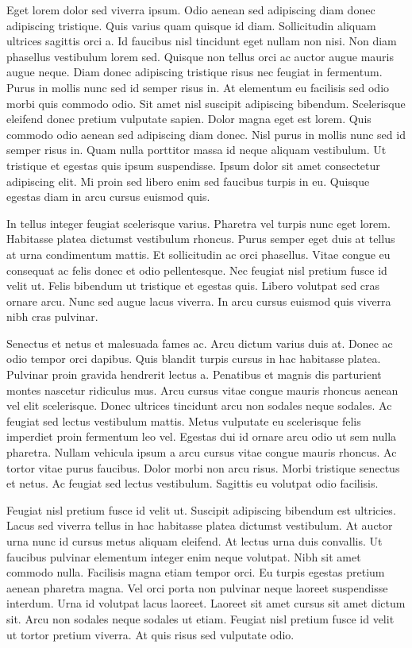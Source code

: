 \documentclass[11pt,a4paper]{article}
\begin{document}
Eget lorem dolor sed viverra ipsum. Odio aenean sed adipiscing diam donec adipiscing tristique. Quis varius quam quisque id diam. Sollicitudin aliquam ultrices sagittis orci a. Id faucibus nisl tincidunt eget nullam non nisi. Non diam phasellus vestibulum lorem sed. Quisque non tellus orci ac auctor augue mauris augue neque. Diam donec adipiscing tristique risus nec feugiat in fermentum. Purus in mollis nunc sed id semper risus in. At elementum eu facilisis sed odio morbi quis commodo odio. Sit amet nisl suscipit adipiscing bibendum. Scelerisque eleifend donec pretium vulputate sapien. Dolor magna eget est lorem. Quis commodo odio aenean sed adipiscing diam donec. Nisl purus in mollis nunc sed id semper risus in. Quam nulla porttitor massa id neque aliquam vestibulum. Ut tristique et egestas quis ipsum suspendisse. Ipsum dolor sit amet consectetur adipiscing elit. Mi proin sed libero enim sed faucibus turpis in eu. Quisque egestas diam in arcu cursus euismod quis.

In tellus integer feugiat scelerisque varius. Pharetra vel turpis nunc eget lorem. Habitasse platea dictumst vestibulum rhoncus. Purus semper eget duis at tellus at urna condimentum mattis. Et sollicitudin ac orci phasellus. Vitae congue eu consequat ac felis donec et odio pellentesque. Nec feugiat nisl pretium fusce id velit ut. Felis bibendum ut tristique et egestas quis. Libero volutpat sed cras ornare arcu. Nunc sed augue lacus viverra. In arcu cursus euismod quis viverra nibh cras pulvinar.

Senectus et netus et malesuada fames ac. Arcu dictum varius duis at. Donec ac odio tempor orci dapibus. Quis blandit turpis cursus in hac habitasse platea. Pulvinar proin gravida hendrerit lectus a. Penatibus et magnis dis parturient montes nascetur ridiculus mus. Arcu cursus vitae congue mauris rhoncus aenean vel elit scelerisque. Donec ultrices tincidunt arcu non sodales neque sodales. Ac feugiat sed lectus vestibulum mattis. Metus vulputate eu scelerisque felis imperdiet proin fermentum leo vel. Egestas dui id ornare arcu odio ut sem nulla pharetra. Nullam vehicula ipsum a arcu cursus vitae congue mauris rhoncus. Ac tortor vitae purus faucibus. Dolor morbi non arcu risus. Morbi tristique senectus et netus. Ac feugiat sed lectus vestibulum. Sagittis eu volutpat odio facilisis.

Feugiat nisl pretium fusce id velit ut. Suscipit adipiscing bibendum est ultricies. Lacus sed viverra tellus in hac habitasse platea dictumst vestibulum. At auctor urna nunc id cursus metus aliquam eleifend. At lectus urna duis convallis. Ut faucibus pulvinar elementum integer enim neque volutpat. Nibh sit amet commodo nulla. Facilisis magna etiam tempor orci. Eu turpis egestas pretium aenean pharetra magna. Vel orci porta non pulvinar neque laoreet suspendisse interdum. Urna id volutpat lacus laoreet. Laoreet sit amet cursus sit amet dictum sit. Arcu non sodales neque sodales ut etiam. Feugiat nisl pretium fusce id velit ut tortor pretium viverra. At quis risus sed vulputate odio.
\end{document}
